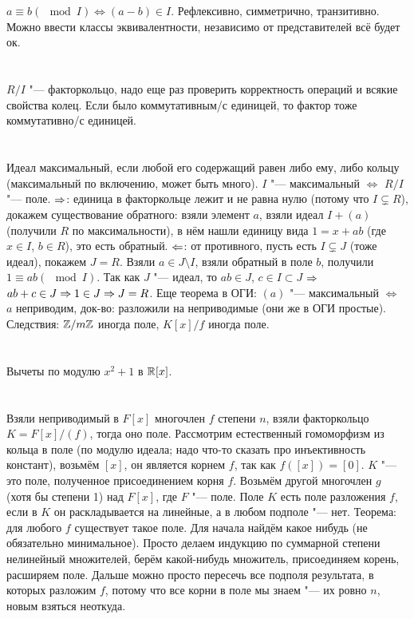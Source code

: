 \section{} %
$a \equiv b (\mod I) \iff (a - b) \in I$.
Рефлексивно, симметрично, транзитивно.
Можно ввести классы эквивалентности, независимо от представителей всё будет ок.

\section{} %
$R/I$ "--- факторкольцо, надо еще раз проверить корректность операций и всякие свойства колец.
Если было коммутативным/с единицей, то фактор тоже коммутативно/с единицей.

\section{} %
Идеал максимальный, если любой его содержащий равен либо ему, либо кольцу (максимальный по включению, может быть много).
$I$ "--- максимальный $\iff$ $R/I$ "--- поле.
$\Rightarrow$: единица в факторкольце лежит и не равна нулю (потому что $I \subsetneq R$),
докажем существование обратного: взяли элемент $a$, взяли идеал $I+(a)$ (получили $R$ по максимальности),
в нём нашли единицу вида $1=x+ab$ (где $x \in I$, $b \in R$), это есть обратный.
$\Leftarrow$: от противного, пусть есть $I \subsetneq J$ (тоже идеал), покажем $J=R$.
Взяли $a \in J \setminus I$, взяли обратный в поле $b$, получили $1 \equiv ab (\mod I)$.
Так как $J$ "--- идеал, то $ab \in J$, $c \in I \subset J$ $\Rightarrow$ $ab+c \in J \Rightarrow 1 \in J \Rightarrow J=R$.
Еще теорема в ОГИ: $(a)$ "--- максимальный $\iff$ $a$ неприводим, док-во: разложили на неприводимые (они же в ОГИ простые).
Следствия: $\mathbb{Z}/m\mathbb{Z}$ иногда поле, $K[x]/f$ иногда поле.

\section{} %
Вычеты по модулю $x^2 + 1$ в $\mathbb{R}[x]$.

\section{} %
Взяли неприводимый в $F[x]$ многочлен $f$ степени $n$, взяли факторкольцо $K=F[x]/(f)$, тогда оно поле.
Рассмотрим естественный гомоморфизм из кольца в поле (по модулю идеала; надо что-то сказать про инъективность констант),
возьмём $[x]$, он является корнем $f$, так как $f([x])=[0]$.
$K$ "--- это поле, полученное присоединением корня $f$.
Возьмём другой многочлен $g$ (хотя бы степени 1) над $F[x]$, где $F$ "--- поле.
Поле $K$ есть поле разложения $f$, если в $K$ он раскладывается на линейные, а в любом подполе "--- нет.
Теорема: для любого $f$ существует такое поле.
Для начала найдём какое нибудь (не обязательно минимальное).
Просто делаем индукцию по суммарной степени нелинейный множителей, берём какой-нибудь множитель, присоединяем корень, расширяем поле.
Дальше можно просто пересечь все подполя результата, в которых разложим $f$, потому что все корни в поле мы знаем "--- их ровно $n$,
новым взяться неоткуда.

